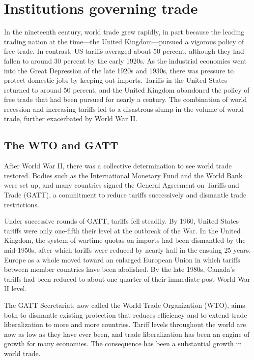 \section{Institutions governing trade}\label{sec:ch15sec7}

In the nineteenth century, world trade grew rapidly, in part because the leading trading nation at the time---the United Kingdom---pursued a vigorous policy of free trade. In contrast, US tariffs averaged about 50 percent, although they had fallen to around 30 percent by the early 1920s. As the industrial economies went into the Great Depression of the late 1920s and 1930s, there was pressure to protect domestic jobs by keeping out imports. Tariffs in the United States returned to around 50 percent, and the United Kingdom abandoned the policy of free trade that had been pursued for nearly a century. The combination of world recession and increasing tariffs led to a disastrous slump in the volume of world trade, further exacerbated by World War II.

\subsection*{The WTO and GATT}

After World War II, there was a collective determination to see world trade restored. Bodies such as the International Monetary Fund and the World Bank were set up, and many countries signed the General Agreement on Tariffs and Trade (GATT), a commitment to reduce tariffs successively and dismantle trade restrictions.

Under successive rounds of GATT, tariffs fell steadily. By 1960, United States tariffs were only one-fifth their level at the outbreak of the War. In the United Kingdom, the system of wartime quotas on imports had been dismantled by the mid-1950s, after which tariffs were reduced by nearly half in the ensuing 25 years. Europe as a whole moved toward an enlarged European Union in which tariffs between member countries have been abolished. By the late 1980s, Canada's tariffs had been reduced to about one-quarter of their immediate post-World War II level.

The GATT Secretariat, now called the World Trade Organization (WTO), aims both to dismantle existing protection that reduces efficiency and to extend trade liberalization to more and more countries. Tariff levels throughout the world are now as low as they have ever been, and trade liberalization has been an engine of growth for many economies. The consequence has been a substantial growth in world trade.

